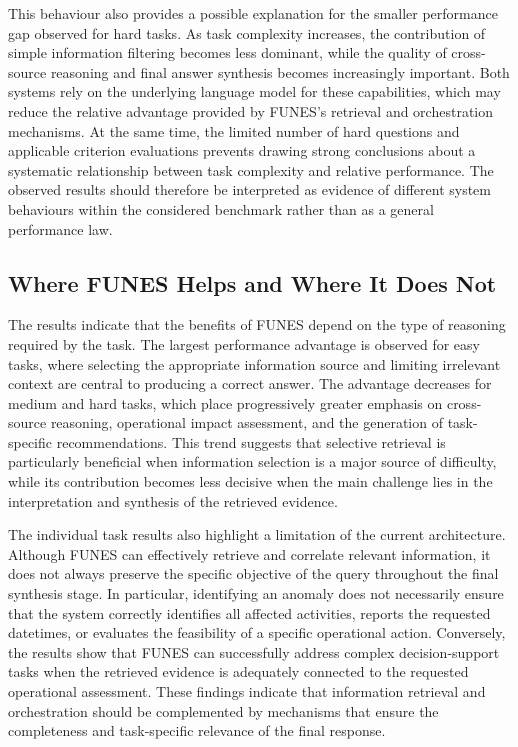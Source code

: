 This behaviour also provides a possible explanation for the smaller performance gap observed for hard tasks. As task complexity increases, the contribution of simple information filtering becomes less dominant, while the quality of cross-source reasoning and final answer synthesis becomes increasingly important. Both systems rely on the underlying language model for these capabilities, which may reduce the relative advantage provided by FUNES's retrieval and orchestration mechanisms. At the same time, the limited number of hard questions and applicable criterion evaluations prevents drawing strong conclusions about a systematic relationship between task complexity and relative performance. The observed results should therefore be interpreted as evidence of different system behaviours within the considered benchmark rather than as a general performance law.


\subsection{Where FUNES Helps and Where It Does Not}
\label{sec:where funes helps}

The results indicate that the benefits of FUNES depend on the type of reasoning required by the task. The largest performance advantage is observed for easy tasks, where selecting the appropriate information source and limiting irrelevant context are central to producing a correct answer. The advantage decreases for medium and hard tasks, which place progressively greater emphasis on cross-source reasoning, operational impact assessment, and the generation of task-specific recommendations. This trend suggests that selective retrieval is particularly beneficial when information selection is a major source of difficulty, while its contribution becomes less decisive when the main challenge lies in the interpretation and synthesis of the retrieved evidence.

The individual task results also highlight a limitation of the current architecture. Although FUNES can effectively retrieve and correlate relevant information, it does not always preserve the specific objective of the query throughout the final synthesis stage. In particular, identifying an anomaly does not necessarily ensure that the system correctly identifies all affected activities, reports the requested datetimes, or evaluates the feasibility of a specific operational action. Conversely, the results show that FUNES can successfully address complex decision-support tasks when the retrieved evidence is adequately connected to the requested operational assessment. These findings indicate that information retrieval and orchestration should be complemented by mechanisms that ensure the completeness and task-specific relevance of the final response.

